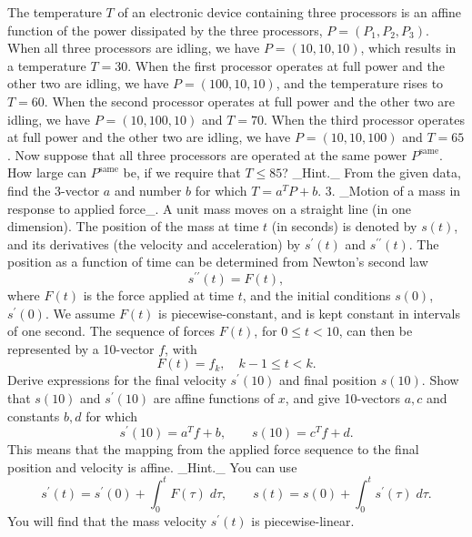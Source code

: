 The temperature \(T\) of an electronic device containing three processors is an affine function of the power dissipated by the three processors, \(P=(P_{1},P_{2},P_{3})\). When all three processors are idling, we have \(P=(10,10,10)\), which results in a temperature \(T=30\). When the first processor operates at full power and the other two are idling, we have \(P=(100,10,10)\), and the temperature rises to \(T=60\). When the second processor operates at full power and the other two are idling, we have \(P=(10,100,10)\) and \(T=70\). When the third processor operates at full power and the other two are idling, we have \(P=(10,10,100)\) and \(T=65\). Now suppose that all three processors are operated at the same power \(P^{\text{same}}\). How large can \(P^{\text{same}}\) be, if we require that \(T\leq 85\)? _Hint._ From the given data, find the 3-vector \(a\) and number \(b\) for which \(T=a^{T}P+b\). 3. _Motion of a mass in response to applied force_. A unit mass moves on a straight line (in one dimension). The position of the mass at time \(t\) (in seconds) is denoted by \(s(t)\), and its derivatives (the velocity and acceleration) by \(s^{\prime}(t)\) and \(s^{\prime\prime}(t)\). The position as a function of time can be determined from Newton's second law \[s^{\prime\prime}(t)=F(t),\] where \(F(t)\) is the force applied at time \(t\), and the initial conditions \(s(0)\), \(s^{\prime}(0)\). We assume \(F(t)\) is piecewise-constant, and is kept constant in intervals of one second. The sequence of forces \(F(t)\), for \(0\leq t<10\), can then be represented by a 10-vector \(f\), with \[F(t)=f_{k},\quad k-1\leq t<k.\] Derive expressions for the final velocity \(s^{\prime}(10)\) and final position \(s(10)\). Show that \(s(10)\) and \(s^{\prime}(10)\) are affine functions of \(x\), and give 10-vectors \(a,c\) and constants \(b,d\) for which \[s^{\prime}(10)=a^{T}f+b,\qquad s(10)=c^{T}f+d.\] This means that the mapping from the applied force sequence to the final position and velocity is affine. _Hint._ You can use \[s^{\prime}(t)=s^{\prime}(0)+\int_{0}^{t}F(\tau)\;d\tau,\qquad s(t)=s(0)+\int_{ 0}^{t}s^{\prime}(\tau)\;d\tau.\] You will find that the mass velocity \(s^{\prime}(t)\) is piecewise-linear.

